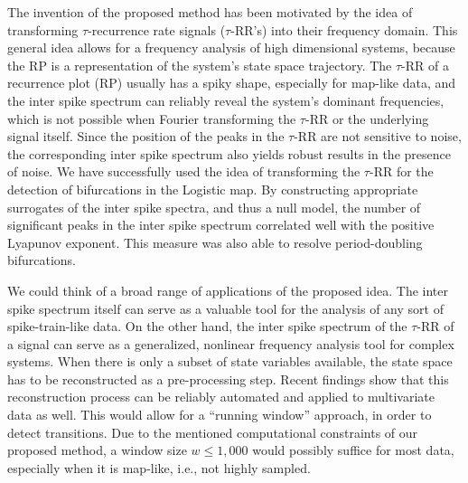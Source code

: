 \documentclass[entropy,article,submit,pdftex,moreauthors]{Definitions/mdpi}
\begin{document}
The invention of the proposed method has been motivated by the idea of transforming $\tau$-recurrence rate signals ($\tau$-RR's) into their frequency domain. 
This general idea \cite{Zbilut2008} allows for a frequency analysis of high dimensional systems, because the RP is a representation of the system's state space trajectory.   
The $\tau$-RR of a recurrence plot (RP) usually has a spiky shape, especially for map-like data, and the inter spike spectrum can reliably reveal the system's dominant frequencies, 
which is not possible when Fourier transforming the $\tau$-RR or the underlying signal itself. Since the position of the peaks 
in the $\tau$-RR are not sensitive to noise, the corresponding inter spike spectrum also yields robust results in the presence of noise. We have successfully used the idea 
of transforming the $\tau$-RR for the detection of bifurcations in the Logistic map. By constructing appropriate surrogates of the inter spike spectra, and thus a null model, 
the number of significant peaks in the inter spike spectrum correlated well with the positive Lyapunov exponent. This measure was also able to resolve period-doubling bifurcations. 

We could think of a broad range of applications of the proposed idea. The inter spike spectrum itself can serve as a valuable tool for the analysis of any sort of 
spike-train-like data. On the other hand, the inter spike spectrum of the $\tau$-RR of a signal can serve as a generalized, nonlinear frequency analysis tool for complex systems. 
When there is only a subset of state variables available, the state space has to be reconstructed as a pre-processing step. Recent findings \cite{Kraemer2021,Kraemer2022} show that 
this reconstruction process can be reliably automated and applied to multivariate data as well. This would allow for a ``running window'' approach, in order to detect transitions. 
Due to the mentioned computational constraints of our proposed method, a window size $w\leq 1,000$ would possibly suffice for most data, especially when it is map-like, i.e., not 
highly sampled. 


\vspace{6pt} 


\end{document}
